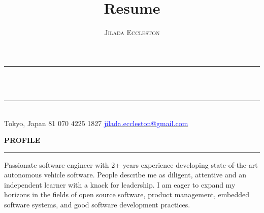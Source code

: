 \documentclass[10pt, a4paper]{article}
\makeatletter
\renewcommand{\maketitle}{
  \begin{center}
    \rule{\textwidth}{0.4pt}\\
    \medskip
    {\Huge\theauthor}\\
    \medskip
    \rule[1.0\baselineskip]{\textwidth}{0.4pt}\\
    \vspace{-1.0em}
    Tokyo, Japan \ding{60}
    \raisebox{0.3ex}{\footnotesize+}81 070\,$\,4225\,$\,1827 \ding{60}
    \href{mailto:jilada.eccleston@gmail.com}{
      \textcolor{blue}{
        jilada.eccleston@gmail.com
      }
    }
  \end{center}
}
\newenvironment{aSection}[1]{
  \begin{center}
    \textbf{\uppercase{#1}}\\
    \vspace{0.5em}
    \hrule
    \vspace{-0.5em}
  \end{center}
}
\makeatother
\begin{document}
\author{\textsc{Jilada Eccleston}}
\title{Resume}

\maketitle

\begin{aSection}{profile}
  Passionate software engineer with 2+ years experience developing state-of-the-art autonomous vehicle software. People describe me as diligent, attentive and an independent learner with a knack for leadership. I am eager to expand my horizons in the fields of open source software, product management, embedded software systems, and good software development practices. 
\end{aSection}
\end{document}
